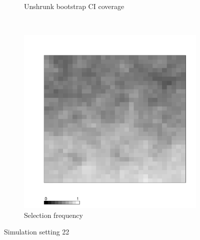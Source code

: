 \documentclass[authoryear, review, 11pt]{elsarticle}
\begin{document}
\begin{figure}
\begin{subfigure}[b]{0.45\textwidth}
		\caption{Unshrunk bootstrap CI coverage}
	\end{subfigure}%
	~ %
	\begin{subfigure}[b]{0.45\textwidth}
	\centering
		\includegraphics[width=\textwidth]{../../figures/simulation/X1.15.22.selection.pdf}
		\caption{Selection frequency}
	\end{subfigure}
	\caption{Simulation setting 22}
\end{figure}
\end{document}
